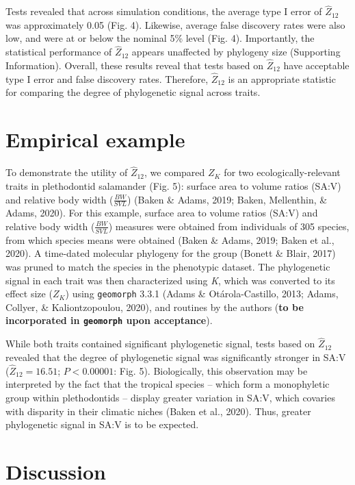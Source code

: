 \documentclass[
]{article}
\begin{document}
Tests revealed that across simulation conditions, the average type I
error of \(\hat{Z}_{12}\) was approximately 0.05 (Fig. 4). Likewise,
average false discovery rates were also low, and were at or below the
nominal 5\% level (Fig. 4). Importantly, the statistical performance of
\(\hat{Z}_{12}\) appears unaffected by phylogeny size (Supporting
Information). Overall, these results reveal that tests based on
\(\hat{Z}_{12}\) have acceptable type I error and false discovery rates.
Therefore, \(\hat{Z}_{12}\) is an appropriate statistic for comparing
the degree of phylogenetic signal across traits.

\hypertarget{empirical-example}{%
\section{Empirical example}\label{empirical-example}}

To demonstrate the utility of \(\hat{Z}_{12}\), we compared \(Z_K\) for
two ecologically-relevant traits in plethodontid salamander (Fig. 5):
surface area to volume ratios (SA:V) and relative body width
(\(\frac{BW}{SVL}\)) (Baken \& Adams, 2019; Baken, Mellenthin, \& Adams,
2020). For this example, surface area to volume ratios (SA:V) and
relative body width (\(\frac{BW}{SVL}\)) measures were obtained from
individuals of 305 species, from which species means were obtained
(Baken \& Adams, 2019; Baken et al., 2020). A time-dated molecular
phylogeny for the group (Bonett \& Blair, 2017) was pruned to match the
species in the phenotypic dataset. The phylogenetic signal in each trait
was then characterized using \emph{K}, which was converted to its effect
size (\(Z_K\)) using \texttt{geomorph} 3.3.1 (Adams \& Otárola-Castillo,
2013; Adams, Collyer, \& Kaliontzopoulou, 2020), and routines by the
authors (\textbf{to be incorporated in \texttt{geomorph} upon
acceptance}). \hfill\break

While both traits contained significant phylogenetic signal, tests based
on \(\hat{Z}_{12}\) revealed that the degree of phylogenetic signal was
significantly stronger in SA:V (\(\hat{Z}_{12}=16.51\); \(P< 0.00001\):
Fig. 5). Biologically, this observation may be interpreted by the fact
that the tropical species -- which form a monophyletic group within
plethodontids -- display greater variation in SA:V, which covaries with
disparity in their climatic niches (Baken et al., 2020). Thus, greater
phylogenetic signal in SA:V is to be expected.

\hypertarget{discussion}{%
\section{Discussion}\label{discussion}}
\end{document}
